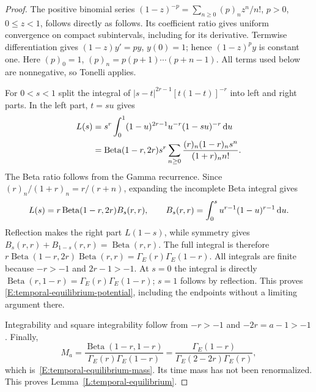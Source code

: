 \begin{proof}
  The positive binomial series $(1-z)^{-p} = \sum_{n\ge0}(p)_nz^n/n!$, $p > 0$,
  $0 \le z < 1$, follows directly as follows. Its coefficient ratio gives
  uniform convergence on compact subintervals, including for its derivative.
  Termwise differentiation gives $(1-z)y' = py$, $y(0) = 1$; hence $(1-z)^py$ is
  constant one. Here $(p)_0 = 1$, $(p)_n = p(p+1)\cdots(p+n-1)$. All terms used
  below are nonnegative, so Tonelli applies.

  For $0 < s < 1$ split the integral of $|s-t|^{2r-1}[t(1-t)]^{-r}$ into left
  and right parts. In the left part, $t = su$ gives
  \begin{align*}
    L(s)
    &=s^r\int_0^1(1-u)^{2r-1}u^{-r}(1-su)^{-r}\,\mathrm{d} u\\
    &=\operatorname{Beta}(1-r,2r)s^r
    \sum_{n\ge0}
    \frac{(r)_n(1-r)_ns^n}{(1+r)_n n!}.
  \end{align*}
  The Beta ratio follows from the Gamma recurrence. Since $(r)_n/(1+r)_n =
  r/(r+n)$, expanding the incomplete Beta integral gives
  \[
    L(s)=r\operatorname{Beta}(1-r,2r)B_s(r,r),\qquad
    B_s(r,r)=\int_0^s u^{r-1}(1-u)^{r-1}\,\mathrm{d} u.
  \]
  Reflection makes the right part $L(1-s)$, while symmetry gives
  $B_s(r,r)+B_{1-s}(r,r) = \operatorname{Beta}(r,r)$. The full integral is
  therefore $r\operatorname{Beta}(1-r,2r)\operatorname{Beta}(r,r) =
  \Gamma_E(r)\Gamma_E(1-r)$. All integrals are finite because $-r > -1$ and
  $2r-1 > -1$. At $s = 0$ the integral is directly $\operatorname{Beta}(r,1-r) =
  \Gamma_E(r)\Gamma_E(1-r)$; $s = 1$ follows by reflection. This proves
  \eqref{E:temporal-equilibrium-potential}, including the endpoints without a
  limiting argument there.

  Integrability and square integrability follow from $-r > -1$ and $-2r = a-1 >
  -1$. Finally,
  \[
    M_a=
    \frac{\operatorname{Beta}(1-r,1-r)}
    {\Gamma_E(r)\Gamma_E(1-r)}
    =\frac{\Gamma_E(1-r)}{\Gamma_E(2-2r)\Gamma_E(r)},
  \]
  which is~\eqref{E:temporal-equilibrium-mass}. Its time mass has not been
  renormalized. This proves Lemma~\ref{L:temporal-equilibrium}.
\end{proof}
